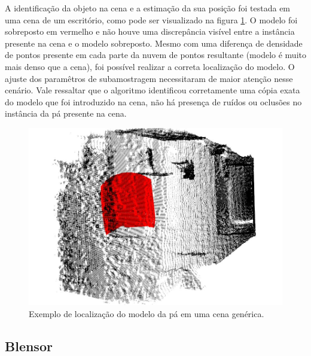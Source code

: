 A identificação da objeto na cena e a estimação da sua posição foi testada em
uma cena de um escritório, como pode ser visualizado na figura
\ref{fig::pa_cena_gen}. O modelo foi sobreposto em vermelho e não houve uma
discrepância visível entre a instância presente na cena e o modelo sobreposto. 
Mesmo com uma diferença de densidade de pontos presente em cada parte da nuvem
de pontos resultante (modelo é muito mais denso que a cena), foi possível
realizar a correta localização do modelo. O ajuste dos paramêtros de
subamostragem necessitaram de maior atenção nesse cenário. Vale ressaltar que o
algoritmo identificou corretamente uma cópia exata do modelo que foi introduzido
na cena, não há presença de ruídos ou oclusões no instância da pá presente na
cena.

\begin{figure}[h!]
	\centering
	\includegraphics[width=0.9\columnwidth]{figs/calibracao/blade_office5}
	\caption{Exemplo de localização do modelo da pá em uma cena genérica.}
    \label{fig::pa_cena_gen}
\end{figure}

\subsection{Blensor}

